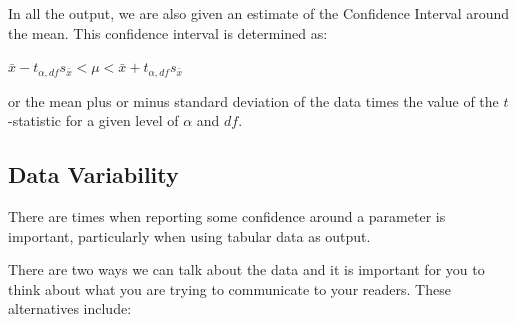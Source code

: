 \documentclass[
  letterpaper,
]{book}
\newenvironment{Shaded}{\begin{snugshade}}{\end{snugshade}}
\newcommand{\DecValTok}[1]{\textcolor[rgb]{0.68,0.00,0.00}{#1}}
\newcommand{\FunctionTok}[1]{\textcolor[rgb]{0.28,0.35,0.67}{#1}}
\newcommand{\NormalTok}[1]{\textcolor[rgb]{0.00,0.23,0.31}{#1}}
\newcommand{\OtherTok}[1]{\textcolor[rgb]{0.00,0.23,0.31}{#1}}
\newcommand{\SpecialCharTok}[1]{\textcolor[rgb]{0.37,0.37,0.37}{#1}}
\newcommand{\StringTok}[1]{\textcolor[rgb]{0.13,0.47,0.30}{#1}}
\begin{document}
In all the output, we are also given an estimate of the Confidence
Interval around the mean. This confidence interval is determined as:

\(\bar{x} - t_{\alpha, df} s_{\bar{x}} < \mu < \bar{x} + t_{\alpha, df} s_{\bar{x}}\)

or the mean plus or minus standard deviation of the data times the value
of the \(t\)-statistic for a given level of \(\alpha\) and \(df\).

\subsection{Data Variability}\label{data-variability}

There are times when reporting some confidence around a parameter is
important, particularly when using tabular data as output.

\begin{Shaded}
\end{Shaded}

There are two ways we can talk about the data and it is important for
you to think about what you are trying to communicate to your readers.
These alternatives include:
\end{document}
